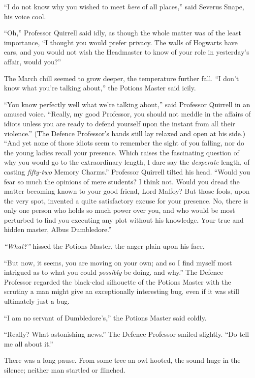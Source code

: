 ``I do not know why you wished to meet \emph{here} of all places,'' said
Severus Snape, his voice cool.

``Oh,'' Professor Quirrell said idly, as though the whole matter was of
the least importance, ``I thought you would prefer privacy. The walls of
Hogwarts have ears, and you would not wish the Headmaster to know of
your role in yesterday's affair, would you?''

The March chill seemed to grow deeper, the temperature further fall. ``I
don't know what you're talking about,'' the Potions Master said icily.

``You know perfectly well what we're talking about,'' said Professor
Quirrell in an amused voice. ``Really, my good Professor, you should not
meddle in the affairs of idiots unless you are ready to defend yourself
upon the instant from all their violence.'' (The Defence Professor's
hands still lay relaxed and open at his side.) ``And yet none of those
idiots seem to remember the sight of you falling, nor do the young
ladies recall your presence. Which raises the fascinating question of
why you would go to the extraordinary length, I dare say the
\emph{desperate} length, of casting \emph{fifty-two} Memory Charms.''
Professor Quirrell tilted his head. ``Would you fear so much the
opinions of mere students? I think not. Would you dread the matter
becoming known to your good friend, Lord Malfoy? But those fools, upon
the very spot, invented a quite satisfactory excuse for your presence.
No, there is only one person who holds so much power over you, and who
would be most perturbed to find you executing any plot without his
knowledge. Your true and hidden master, Albus Dumbledore.''

\emph{``What?''} hissed the Potions Master, the anger plain upon his
face.

``But now, it seems, you are moving on your own; and so I find myself
most intrigued as to what you could \emph{possibly} be doing, and why.''
The Defence Professor regarded the black-clad silhouette of the Potions
Master with the scrutiny a man might give an exceptionally interesting
bug, even if it was still ultimately just a bug.

``I am no servant of Dumbledore's,'' the Potions Master said coldly.

``Really? What astonishing news.'' The Defence Professor smiled
slightly. ``Do tell me all about it.''

There was a long pause. From some tree an owl hooted, the sound huge in
the silence; neither man startled or flinched.


